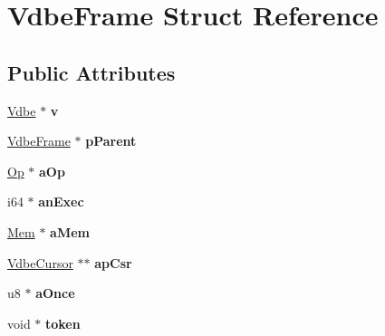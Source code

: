\hypertarget{struct_vdbe_frame}{}\section{Vdbe\+Frame Struct Reference}
\label{struct_vdbe_frame}
\subsection*{Public Attributes}
\begin{DoxyCompactItemize}
\item 
\mbox{\label{struct_vdbe_frame_a2f6258356959c94398d1d006a740c4ce}} 
\mbox{\hyperlink{struct_vdbe}{Vdbe}} $\ast$ {\bfseries v}
\item 
\mbox{\label{struct_vdbe_frame_afb11d8aa920f34720333f52737375d59}} 
\mbox{\hyperlink{struct_vdbe_frame}{Vdbe\+Frame}} $\ast$ {\bfseries p\+Parent}
\item 
\mbox{\label{struct_vdbe_frame_a0e5670c52e8eeb7e66bf1e3bff8ce2b5}} 
\mbox{\hyperlink{struct_vdbe_op}{Op}} $\ast$ {\bfseries a\+Op}
\item 
\mbox{\label{struct_vdbe_frame_aed133c8d63e9c5dd3dedaff47984b467}} 
i64 $\ast$ {\bfseries an\+Exec}
\item 
\mbox{\label{struct_vdbe_frame_a98b9eabf633e77d4ae2dfe9d13a43fdf}} 
\mbox{\hyperlink{structsqlite3__value}{Mem}} $\ast$ {\bfseries a\+Mem}
\item 
\mbox{\label{struct_vdbe_frame_a5d373b3a195dbd1a31f5aa0dbe1822ee}} 
\mbox{\hyperlink{struct_vdbe_cursor}{Vdbe\+Cursor}} $\ast$$\ast$ {\bfseries ap\+Csr}
\item 
\mbox{\label{struct_vdbe_frame_adf0a39294b8e21bf54019e497a04e5c6}} 
u8 $\ast$ {\bfseries a\+Once}
\item 
\mbox{\label{struct_vdbe_frame_a11de10011ea2164995c6b616bba8a576}} 
void $\ast$ {\bfseries token}
\item 
\mbox{\label{struct_vdbe_frame_af655193217fb53c7acab9d24c94344aa}} 
$$
\end{DoxyCompactItemize}
